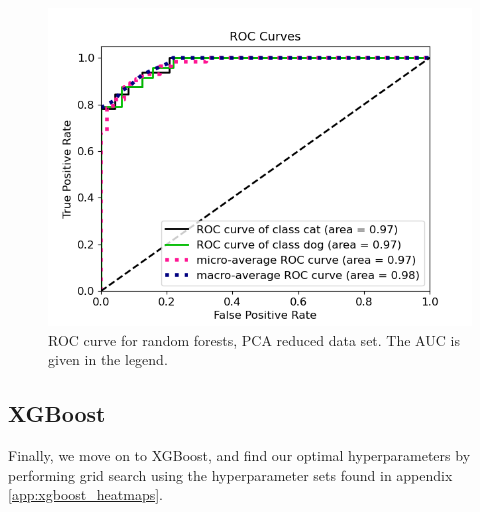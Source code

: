 \documentclass[a4paper]{article}
\begin{document}
\begin{figure}[H]
	\centering
	\includegraphics[scale=0.5]{../figures/random_forest/roc_nbins200_pca35_seed4155_ts0.20.png}
	\caption{ROC curve for random forests, PCA reduced data set. The AUC is given in the legend.}
	\label{fig:rf_roc_pca}
\end{figure}	


\subsection{XGBoost}
Finally, we move on to XGBoost, and find our optimal hyperparameters by performing grid search using the hyperparameter sets found in appendix \ref{app:xgboost_heatmaps}.
\end{document}
